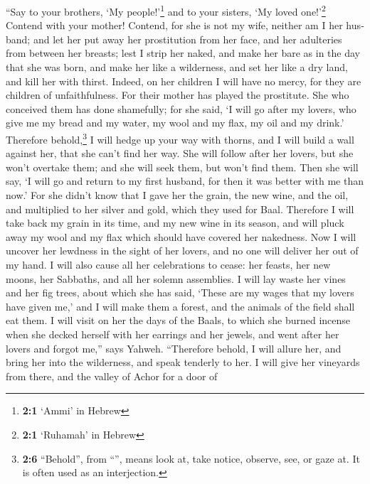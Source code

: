 \begin{paracol}{2}
\begin{otherlanguage}{english}
 ``Say to your brothers, `My people!'\footnote{\textbf{2:1}
  `Ammi' in Hebrew} and to your sisters, `My loved one!'\footnote{\textbf{2:1}
  `Ruhamah' in Hebrew}  Contend with your mother! Contend,
for she is not my wife, neither am I her husband; and let her put away
her prostitution from her face, and her adulteries from between her
breasts;  lest I strip her naked, and make her bare as in
the day that she was born, and make her like a wilderness, and set her
like a dry land, and kill her with thirst.  Indeed, on her
children I will have no mercy, for they are children of unfaithfulness.
 For their mother has played the prostitute. She who
conceived them has done shamefully; for she said, `I will go after my
lovers, who give me my bread and my water, my wool and my flax, my oil
and my drink.'  Therefore behold,\footnote{\textbf{2:6}
  ``Behold'', from ``'', means look at, take notice,
  observe, see, or gaze at. It is often used as an interjection.} I will
hedge up your way with thorns, and I will build a wall against her, that
she can't find her way.  She will follow after her lovers,
but she won't overtake them; and she will seek them, but won't find
them. Then she will say, `I will go and return to my first husband, for
then it was better with me than now.'  For she didn't know
that I gave her the grain, the new wine, and the oil, and multiplied to
her silver and gold, which they used for Baal.  Therefore
I will take back my grain in its time, and my new wine in its season,
and will pluck away my wool and my flax which should have covered her
nakedness.  Now I will uncover her lewdness in the sight
of her lovers, and no one will deliver her out of my hand.
 I will also cause all her celebrations to cease: her
feasts, her new moons, her Sabbaths, and all her solemn assemblies.
 I will lay waste her vines and her fig trees, about
which she has said, `These are my wages that my lovers have given me,'
and I will make them a forest, and the animals of the field shall eat
them.  I will visit on her the days of the Baals, to
which she burned incense when she decked herself with her earrings and
her jewels, and went after her lovers and forgot me,'' says Yahweh.
 ``Therefore behold, I will allure her, and bring her
into the wilderness, and speak tenderly to her.  I will
give her vineyards from there, and the valley of Achor for a door of

\end{otherlanguage}
\end{paracol}
